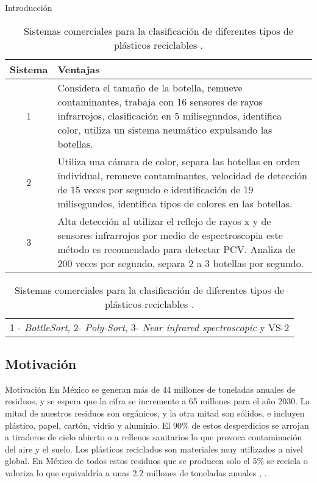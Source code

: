 \documentclass[10pt]{beamer}
\begin{document}
\begin{frame}{Introducción}
\begin{table}[h]
    \caption{Sistemas comerciales para la clasificación de diferentes tipos de plásticos reciclables \cite{Angeles2021}. }
    \label{Sistemas}
    \resizebox{10cm}{!} {
    \begin{tabular}{c m{33 em}}
         \hline
           Sistema & Ventajas \\  
         \hline
           1 & Considera el tamaño de la botella, remueve contaminantes, trabaja con 16 sensores de rayos infrarrojos, clasificación en 5 milisegundos, identifica color, utiliza un sistema neumático expulsando las botellas. \\
           2 & Utiliza una cámara de color, separa las botellas en orden individual, remueve contaminantes, velocidad de detección de 15 veces por segundo e identificación de 19 milisegundos, identifica tipos de colores en las botellas. \\
          
          3 & Alta detección al utilizar el reflejo de rayos x y de sensores infrarrojos por medio de espectroscopia este método es recomendado para detectar PCV. Analiza de 200 veces por segundo, separa 2 a 3 botellas por segundo. \\
         \hline
    \end{tabular}
    }
    \resizebox{10cm}{!} {
    \begin{tabular}{l}
            1 - \textit{BottleSort}, 2- \textit{Poly-Sort}, 3- \textit{Near infrared spectroscopic} y VS-2 \\
         \end{tabular}
    }
\end{table}
\end{frame}


\subsection{Motivación}
\begin{frame}{Motivación}
En México se generan más de 44 millones de toneladas anuales de residuos, y se espera que la cifra se incremente a 65 millones para el año 2030.
La mitad de nuestros residuos son orgánicos, y la otra mitad son sólidos, e incluyen plástico, papel, cartón, vidrio y aluminio.
El 90{$\%$} de estos desperdicios se arrojan a tiraderos de cielo abierto o a rellenos sanitarios lo que provoca contaminación del aire y el suelo.
Los plásticos reciclados son materiales muy utilizados a nivel global. 
En México de todos estos residuos que se producen solo el 5{$\%$} se recicla o valoriza lo que equivaldría a unas 2.2 millones de toneladas anuales \cite{SEMARNAT2019}, \cite{Angeles2021}.

\end{frame}
\end{document}
